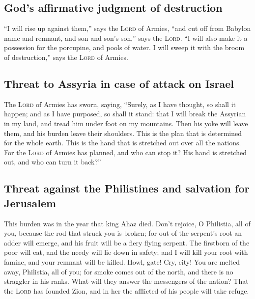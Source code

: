 \hypertarget{gods-affirmative-judgment-of-destruction}{%
\subsection{God's affirmative judgment of
destruction}\label{gods-affirmative-judgment-of-destruction}}

 ``I will rise up against them,'' says the \textsc{Lord}
of Armies, ``and cut off from Babylon name and remnant, and son and
son's son,'' says the \textsc{Lord}.  ``I will also make
it a possession for the porcupine, and pools of water. I will sweep it
with the broom of destruction,'' says the \textsc{Lord} of Armies.

\hypertarget{threat-to-assyria-in-case-of-attack-on-israel}{%
\subsection{Threat to Assyria in case of attack on
Israel}\label{threat-to-assyria-in-case-of-attack-on-israel}}

 The \textsc{Lord} of Armies has sworn, saying, ``Surely,
as I have thought, so shall it happen; and as I have purposed, so shall
it stand:  that I will break the Assyrian in my land, and
tread him under foot on my mountains. Then his yoke will leave them, and
his burden leave their shoulders.  This is the plan that
is determined for the whole earth. This is the hand that is stretched
out over all the nations.  For the \textsc{Lord} of
Armies has planned, and who can stop it? His hand is stretched out, and
who can turn it back?''

\hypertarget{threat-against-the-philistines-and-salvation-for-jerusalem}{%
\subsection{Threat against the Philistines and salvation for
Jerusalem}\label{threat-against-the-philistines-and-salvation-for-jerusalem}}

 This burden was in the year that king Ahaz died.
 Don't rejoice, O Philistia, all of you, because the rod
that struck you is broken; for out of the serpent's root an adder will
emerge, and his fruit will be a fiery flying serpent. 
The firstborn of the poor will eat, and the needy will lie down in
safety; and I will kill your root with famine, and your remnant will be
killed.  Howl, gate! Cry, city! You are melted away,
Philistia, all of you; for smoke comes out of the north, and there is no
straggler in his ranks.  What will they answer the
messengers of the nation? That the \textsc{Lord} has founded Zion, and
in her the afflicted of his people will take refuge.

